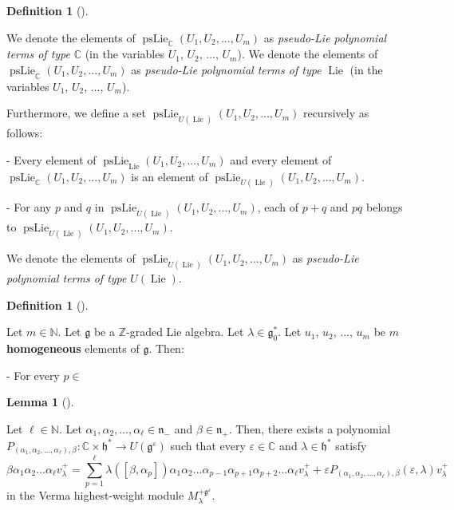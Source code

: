 \documentclass
[numbers=enddot,12pt,final,onecolumn,german,notitlepage]{scrartcl}%
\theoremstyle{definition}
\newtheorem{lem}[theo]{Lemma}
\newenvironment{lemma}[1][]
{\begin{lem}[#1]\begin{leftbar}}
{\end{leftbar}\end{lem}}
\newtheorem{defi}[theo]{Definition}
\newenvironment{definition}[1][]
{\begin{defi}[#1]\begin{leftbar}}
{\end{leftbar}\end{defi}}
\begin{document}
\begin{definition}
We denote the elements of $\operatorname*{psLie}\nolimits_{\mathbb{C}}\left(
U_{1},U_{2},...,U_{m}\right)  $ as \textit{pseudo-Lie polynomial terms of type
}$\mathbb{C}$ (in the variables $U_{1}$, $U_{2}$, $...$, $U_{m}$). We denote
the elements of $\operatorname*{psLie}\nolimits_{\mathbb{C}}\left(
U_{1},U_{2},...,U_{m}\right)  $ as \textit{pseudo-Lie polynomial terms of type
}$\operatorname*{Lie}$ (in the variables $U_{1}$, $U_{2}$, $...$, $U_{m}$).

Furthermore, we define a set $\operatorname*{psLie}\nolimits_{U\left(
\operatorname*{Lie}\right)  }\left(  U_{1},U_{2},...,U_{m}\right)  $
recursively as follows:

- Every element of $\operatorname*{psLie}\nolimits_{\operatorname*{Lie}%
}\left(  U_{1},U_{2},...,U_{m}\right)  $ and every element of
$\operatorname*{psLie}\nolimits_{\mathbb{C}}\left(  U_{1},U_{2},...,U_{m}%
\right)  $ is an element of $\operatorname*{psLie}\nolimits_{U\left(
\operatorname*{Lie}\right)  }\left(  U_{1},U_{2},...,U_{m}\right)  $.

- For any $p$ and $q$ in $\operatorname*{psLie}\nolimits_{U\left(
\operatorname*{Lie}\right)  }\left(  U_{1},U_{2},...,U_{m}\right)  $, each of
$p+q$ and $pq$ belongs to $\operatorname*{psLie}\nolimits_{U\left(
\operatorname*{Lie}\right)  }\left(  U_{1},U_{2},...,U_{m}\right)  $.

We denote the elements of $\operatorname*{psLie}\nolimits_{U\left(
\operatorname*{Lie}\right)  }\left(  U_{1},U_{2},...,U_{m}\right)  $ as
\textit{pseudo-Lie polynomial terms of type }$U\left(  \operatorname*{Lie}%
\right)  $.
\end{definition}

\begin{definition}
Let $m\in\mathbb{N}$. Let $\mathfrak{g}$ be a $\mathbb{Z}$-graded Lie algebra.
Let $\lambda\in\mathfrak{g}_{0}^{\ast}$. Let $u_{1}$, $u_{2}$, $...$, $u_{m}$
be $m$ \textbf{homogeneous} elements of $\mathfrak{g}$. Then:

- For every $p\in$
\end{definition}

\begin{lemma}
\label{lem.invformnondeg.form1}Let $\ell\in\mathbb{N}$. Let $\alpha_{1}%
,\alpha_{2},...,\alpha_{\ell}\in\mathfrak{n}_{-}$ and $\beta\in\mathfrak{n}%
_{+}$. Then, there exists a polynomial $P_{\left(  \alpha_{1},\alpha
_{2},...,\alpha_{\ell}\right)  ,\beta}:\mathbb{C}\times\mathfrak{h}^{\ast
}\rightarrow U\left(  \mathfrak{g}^{\varepsilon}\right)  $ such that every
$\varepsilon\in\mathbb{C}$ and $\lambda\in\mathfrak{h}^{\ast}$ satisfy%
\[
\beta\alpha_{1}\alpha_{2}...\alpha_{\ell}v_{\lambda}^{+}=\sum\limits_{p=1}%
^{\ell}\lambda\left(  \left[  \beta,\alpha_{p}\right]  \right)  \alpha
_{1}\alpha_{2}...\alpha_{p-1}\alpha_{p+1}\alpha_{p+2}...\alpha_{\ell
}v_{\lambda}^{+}+\varepsilon P_{\left(  \alpha_{1},\alpha_{2},...,\alpha
_{\ell}\right)  ,\beta}\left(  \varepsilon,\lambda\right)  v_{\lambda}^{+}%
\]
in the Verma highest-weight module $M_{\lambda}^{+\mathfrak{g}^{\varepsilon}}$.
\end{lemma}
\end{document}
